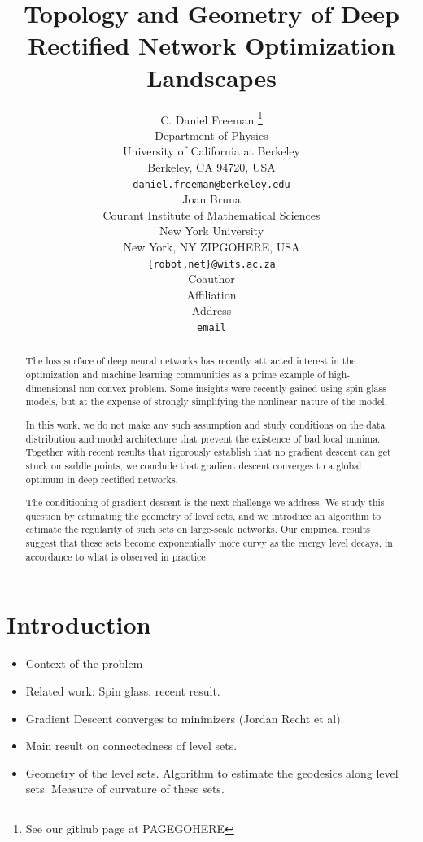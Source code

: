 \documentclass{article} %
\title{Topology and Geometry of Deep Rectified Network Optimization Landscapes }
\author{C. Daniel Freeman \thanks{ See our github page at PAGEGOHERE} \\
Department of Physics\\
University of California at Berkeley\\
Berkeley, CA 94720, USA \\
\texttt{daniel.freeman@berkeley.edu} \\
\And
Joan Bruna \\
Courant Institute of Mathematical Sciences \\
New York University \\
New York, NY ZIPGOHERE, USA \\
\texttt{\{robot,net\}@wits.ac.za} \\
\AND
Coauthor \\
Affiliation \\
Address \\
\texttt{email}
}
\begin{document}
\maketitle

\begin{abstract}
The loss surface of deep neural networks has recently attracted interest 
in the optimization and machine learning communities as a prime example of 
high-dimensional non-convex problem. Some insights were recently gained using spin glass 
models, but at the expense of strongly simplifying the nonlinear nature of the model.

In this work, we do not make any such assumption and study conditions 
on the data distribution and model architecture that prevent the existence 
of bad local minima. Together with 
recent results that rigorously establish that no gradient descent can 
get stuck on saddle points, we conclude that gradient descent converges
to a global optimum in deep rectified networks. 

The conditioning of gradient descent is the next challenge we address. 
We study this question by estimating the geometry of level sets, and we introduce
an algorithm to estimate the regularity of such sets on large-scale networks. 
Our empirical results suggest that these sets become exponentially more curvy 
as the energy level decays, in accordance to what is observed in practice. 
\end{abstract}

\tableofcontents

\section{Introduction}
\label{sec:Intro}

\begin{itemize}
\item Context of the problem
\item Related work: Spin glass, recent result.
\item Gradient Descent converges to minimizers (Jordan Recht et al). 
\item Main result on connectedness of level sets.
\item Geometry of the level sets. Algorithm to estimate the geodesics along level sets. Measure of curvature of these sets. 
\end{itemize}
  
\end{document}

